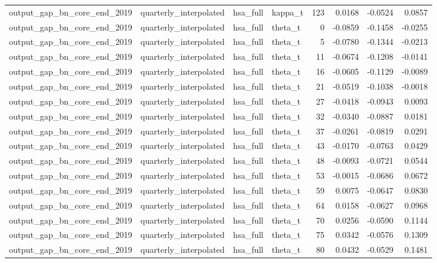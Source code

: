 \begin{tabular}{llllrrrr}
output\_gap\_bn\_core\_end\_2019 & quarterly\_interpolated & hsa\_full & kappa\_t & 123 & 0.0168 & -0.0524 & 0.0857 \\
output\_gap\_bn\_core\_end\_2019 & quarterly\_interpolated & hsa\_full & theta\_t & 0 & -0.0859 & -0.1458 & -0.0255 \\
output\_gap\_bn\_core\_end\_2019 & quarterly\_interpolated & hsa\_full & theta\_t & 5 & -0.0780 & -0.1344 & -0.0213 \\
output\_gap\_bn\_core\_end\_2019 & quarterly\_interpolated & hsa\_full & theta\_t & 11 & -0.0674 & -0.1208 & -0.0141 \\
output\_gap\_bn\_core\_end\_2019 & quarterly\_interpolated & hsa\_full & theta\_t & 16 & -0.0605 & -0.1129 & -0.0089 \\
output\_gap\_bn\_core\_end\_2019 & quarterly\_interpolated & hsa\_full & theta\_t & 21 & -0.0519 & -0.1038 & -0.0018 \\
output\_gap\_bn\_core\_end\_2019 & quarterly\_interpolated & hsa\_full & theta\_t & 27 & -0.0418 & -0.0943 & 0.0093 \\
output\_gap\_bn\_core\_end\_2019 & quarterly\_interpolated & hsa\_full & theta\_t & 32 & -0.0340 & -0.0887 & 0.0181 \\
output\_gap\_bn\_core\_end\_2019 & quarterly\_interpolated & hsa\_full & theta\_t & 37 & -0.0261 & -0.0819 & 0.0291 \\
output\_gap\_bn\_core\_end\_2019 & quarterly\_interpolated & hsa\_full & theta\_t & 43 & -0.0170 & -0.0763 & 0.0429 \\
output\_gap\_bn\_core\_end\_2019 & quarterly\_interpolated & hsa\_full & theta\_t & 48 & -0.0093 & -0.0721 & 0.0544 \\
output\_gap\_bn\_core\_end\_2019 & quarterly\_interpolated & hsa\_full & theta\_t & 53 & -0.0015 & -0.0686 & 0.0672 \\
output\_gap\_bn\_core\_end\_2019 & quarterly\_interpolated & hsa\_full & theta\_t & 59 & 0.0075 & -0.0647 & 0.0830 \\
output\_gap\_bn\_core\_end\_2019 & quarterly\_interpolated & hsa\_full & theta\_t & 64 & 0.0158 & -0.0627 & 0.0968 \\
output\_gap\_bn\_core\_end\_2019 & quarterly\_interpolated & hsa\_full & theta\_t & 70 & 0.0256 & -0.0590 & 0.1144 \\
output\_gap\_bn\_core\_end\_2019 & quarterly\_interpolated & hsa\_full & theta\_t & 75 & 0.0342 & -0.0576 & 0.1309 \\
output\_gap\_bn\_core\_end\_2019 & quarterly\_interpolated & hsa\_full & theta\_t & 80 & 0.0432 & -0.0529 & 0.1481 \\

\end{tabular}
